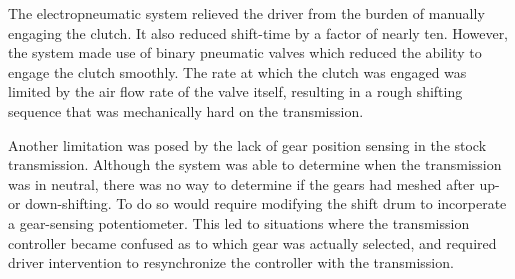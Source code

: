 The electropneumatic system relieved the driver from the burden of manually engaging the clutch. It also reduced shift-time by a factor of nearly ten. However, the system made use of binary pneumatic valves which reduced the ability to engage the clutch smoothly. The rate at which the clutch was engaged was limited by the air flow rate of the valve itself, resulting in a rough shifting sequence that was mechanically hard on the transmission. 

Another limitation was posed by the lack of gear position sensing in the stock transmission. Although the system was able to determine when the transmission was in neutral, there was no way to determine if the gears had meshed after up- or down-shifting. To do so would require modifying the shift drum to incorperate a gear-sensing potentiometer. This led to situations where the transmission controller became confused as to which gear was actually selected, and required driver intervention to resynchronize the controller with the transmission.

